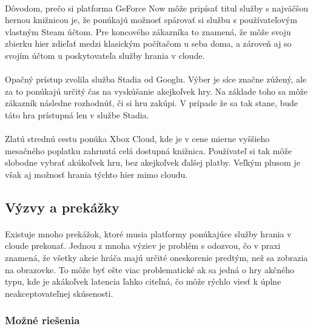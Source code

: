 \documentclass[10pt,twoside,slovak,a4paper]{article}
\begin{document}
\paragraph{} Dôvodom, prečo si platforma GeForce Now môže pripísať titul služby s najväčšou hernou knižnicou je, že ponúkajú možnosť spárovať si službu s používateľovým vlastným Steam účtom. Pre koncového zákazníka to znamená, že môže svoju zbierku hier zdieľať medzi klasickým počítačom u seba doma, a zároveň aj so svojím účtom u poskytovateľa služby hrania v cloude.

\paragraph{} Opačný prístup zvolila služba Stadia od Googlu. Výber je síce značne zúžený, ale za to ponúkajú určitý čas na vyskúšanie akejkoľvek hry. Na základe toho sa môže zákazník následne rozhodnúť, či si hru zakúpi. V prípade že sa tak stane, bude táto hra prístupná len v službe Stadia.

\paragraph{} Zlatú strednú cestu ponúka Xbox Cloud, kde je v cene mierne vyššieho mesačného poplatku zahrnutá celá dostupná knižnica. Používateľ si tak môže slobodne vybrať akúkoľvek hru, bez akejkoľvek ďalšej platby. Veľkým plusom je však aj možnosť hrania týchto hier mimo cloudu.



\subsection{Výzvy a prekážky}

\paragraph{} Existuje mnoho prekážok, ktoré musia platformy ponúkajúce služby hrania v cloude prekonať. Jednou z mnoha výziev je problém s odozvou, čo v praxi znamená, že všetky akcie hráča majú určité oneskorenie predtým, než sa zobrazia na obrazovke. To môže byť ešte viac problematické ak sa jedná o hry akčného typu, kde je akákoľvek latencia ľahko citeľná, čo môže rýchlo viesť k úplne neakceptovateľnej skúsenosti. \cite{4591393} \cite{10.1145/1016540.1016557}

\subsubsection{Možné riešenia}
\end{document}

